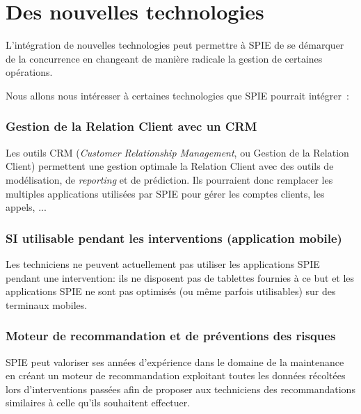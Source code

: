 \section{Des nouvelles technologies}

    L'intégration de nouvelles technologies peut permettre à SPIE de se démarquer de la concurrence en changeant de manière radicale la gestion de certaines opérations.

    Nous allons nous intéresser à certaines technologies que SPIE pourrait intégrer~:


    \subsubsection{Gestion de la Relation Client avec un CRM}

        Les outils CRM (\textit{Customer Relationship Management}, ou Gestion de la Relation Client) permettent une gestion optimale la Relation Client avec des outils de modélisation, de \textit{reporting} et de prédiction. Ils pourraient donc remplacer les multiples applications utilisées par SPIE pour gérer les comptes clients, les appels, ...

    \subsubsection{SI utilisable pendant les interventions (application mobile)}

        Les techniciens ne peuvent actuellement pas utiliser les applications SPIE pendant une intervention: ils ne disposent pas de tablettes fournies à ce but et les applications SPIE ne sont pas optimisés (ou même parfois utilisables) sur des terminaux mobiles.

    \subsubsection{Moteur de recommandation et de préventions des risques}

        SPIE peut valoriser ses années d'expérience dans le domaine de la maintenance en créant un moteur de recommandation exploitant toutes les données récoltées lors d'interventions passées afin de proposer aux techniciens des recommandations similaires à celle qu'ils souhaitent effectuer.
